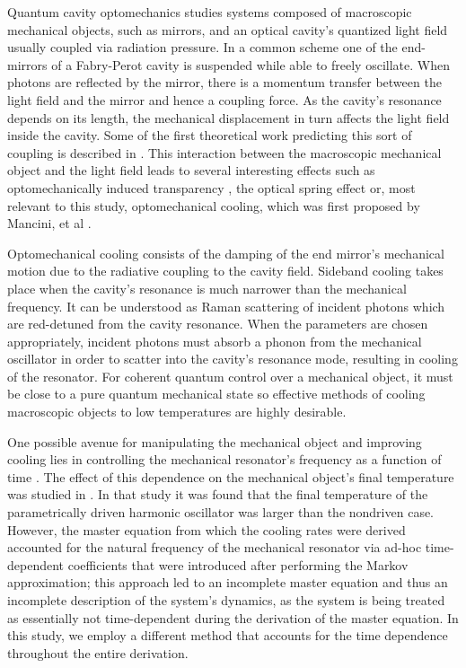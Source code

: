 \documentclass[reprint, amsmath,amssymb, aps,pra]{revtex4-1}
\begin{document}
Quantum cavity optomechanics studies systems composed of macroscopic
mechanical objects, such as mirrors, and an optical cavity's quantized
light field usually coupled via radiation pressure. In a common scheme
one of the end-mirrors of a Fabry-Perot cavity is suspended while able
to freely oscillate. When photons are reflected by the mirror, there
is a momentum transfer between the light field and the mirror and
hence a coupling force. As the cavity's resonance depends on its
length, the mechanical displacement in turn affects the light field
inside the cavity. Some of the first theoretical work predicting this
sort of coupling is described in \cite{BraginskiiOG}. This interaction
between the macroscopic mechanical object and the light field leads to
several interesting effects such as optomechanically induced
transparency \cite{WeissOIT}, the optical spring effect \cite{VogelOT}
or, most relevant to this study, optomechanical cooling, which was
first proposed by Mancini, et al \cite{CohadonCM, CorbittOC,
  SchliesserRPC, LCNooshi, ManciniOC}.
	
Optomechanical cooling consists of the damping of the end mirror's
mechanical motion due to the radiative coupling to the cavity field.
Sideband cooling takes place when the cavity's resonance is much
narrower than the mechanical frequency. It can be understood as Raman
scattering of incident photons \cite{MarquardtQTOQ} which are
red-detuned from the cavity resonance. When the parameters are chosen
appropriately, incident photons must absorb a phonon from the
mechanical oscillator in order to scatter into the cavity's resonance
mode, resulting in cooling of the resonator. For coherent quantum
control over a mechanical object, it must be close to a pure quantum
mechanical state \cite{KippenberCO} so effective methods of cooling
macroscopic objects to low temperatures are highly desirable.

One possible avenue for manipulating the mechanical object and
improving cooling lies in controlling the mechanical resonator's
frequency as a function of time \cite{JockelMR}. The effect of this
dependence on the mechanical object's final temperature was studied in
\cite{BarberisLC}. In that study it was found that the final
temperature of the parametrically driven harmonic oscillator was
larger than the nondriven case. However, the master equation from
which the cooling rates were derived accounted for the natural
frequency of the mechanical resonator via ad-hoc time-dependent
coefficients that were introduced after performing the Markov
approximation; this approach led to an incomplete master equation and
thus an incomplete description of the system's dynamics, as the system
is being treated as essentially not time-dependent during the
derivation of the master equation. In this study, we employ a
different method that accounts for the time dependence throughout the
entire derivation.
\end{document}
